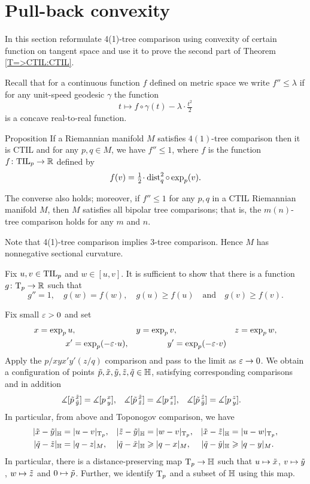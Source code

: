 \section{Pull-back convexity}\label{convexity}

In this section reformulate 4(1)-tree comparison using convexity of certain function on tangent space and use it to prove the second part of Theorem \ref{T=>CTIL:CTIL}.

Recall that for a continuous function $f$ defined on metric space we write 
$f''\le \lambda$ if for any unit-speed geodesic $\gamma$ the function
\[t\mapsto f\circ\gamma(t)-\lambda\cdot \tfrac{t^2}{2}\]
is a concave real-to-real function.

\begin{thm}{Proposition}\label{prop:convexity}
If a Riemannian manifold $M$ satisfies $4(1)$-tree comparison then it is CTIL and for any $p,q\in M$, we have $f''\le 1$, where $f$ is the function $f\: \TIL_p\to \RR$ defined by
\[f(v)=\tfrac12\cdot\dist_q^2\circ\exp_p(v).\] 

The converse also holds; moreover, if $f''\le 1$ for any $p,q$ in a CTIL Riemannian manifold $M$, then $M$ satisfies all bipolar tree comparisons; that is, the $m(n)$-tree comparison holds for any $m$ and $n$.
\end{thm}

Note that 4(1)-tree comparison implies 3-tree comparison.
Hence $M$ has nonnegative sectional curvature.

Fix $u,v\in \TIL_p$ and $w\in [u,v]$.
It is sufficient to show that there is a function $g\:\T_p\to \RR$ such that
\[g''=1,\quad
g(w)=f(w),\quad
g(u)\ge f(u)\quad
\text{and}\quad
g(v)\ge f(v).\]

Fix small $\eps>0$ and set
\begin{align*}
x=\exp_p u&,
&y=\exp_p v&, 
&z=\exp_pw&,
\\
x'&=\exp_p(-\eps\cdot  u),
&y'&=\exp_p(-\eps\cdot  v)
\end{align*}
Apply the $p/xyx'y'(z/q)$ comparison and pass to the limit as $\eps\to 0$.
We obtain a configuration of points $\~p, \~x, \~y, \~z, \~q\in\HH$, satisfying corresponding comparisons and
in addition
\begin{align*}
\measuredangle[\~p\,^{\~x}_{\~y}]&= \measuredangle[p\,^{x}_{y}],
&\measuredangle[\~p\,^{\~x}_{\~z}]&= \measuredangle[p\,^{x}_{z}],
&\measuredangle[\~p\,^{\~z}_{\~y}]&= \measuredangle[p\,^{z}_{y}].
\end{align*}
In particular,
from above and Toponogov comparison, we have
\begin{align*}
|\~x-\~y|_\HH&=|u-v|_{\T_p},
&|\~z-\~y|_\HH&=|w-v|_{\T_p},
&|\~x-\~z|_\HH&=|u-w|_{\T_p},
\\
|\~q-\~z|_\HH&=|q-z|_M,
&|\~q-\~x|_\HH&\ge|q-x|_M,
&|\~q-\~y|_\HH&\ge|q-y|_M.
\end{align*}
In particular, there is a distance-preserving map $\T_p\to \HH$ 
such that $u\mapsto \~x$, $v\mapsto \~y$, $w\mapsto \~z$ and $0\mapsto \~p$.
Further, we identify $\T_p$ and a subset of $\HH$ using this map.


